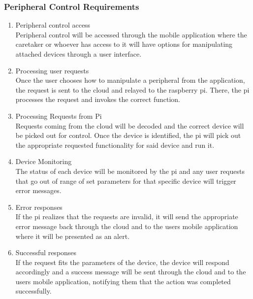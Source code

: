 \subsubsection{Peripheral Control Requirements}
        	\begin{enumerate}
            	\item{Peripheral control access\\Peripheral control will be accessed through the mobile application where the caretaker or whoever has access to it will have options for manipulating attached devices through a user interface.}
                \item{Processing user requests\\Once the user chooses how to manipulate a peripheral from the application, the request is sent to the cloud and relayed to the raspberry pi. There, the pi processes the request and invokes the correct function.}
                \item{Processing Requests from Pi\\ Requests coming from the cloud will be decoded and the correct device will be picked out for control. Once the device is identified, the pi will pick out the appropriate requested functionality for said device and run it.}
                \item{Device Monitoring\\The status of each device will be monitored by the pi and any user requests that go out of range of set parameters for that specific device will trigger error messages.}
                \item{Error responses\\If the pi realizes that the requests are invalid, it will send the appropriate error message back through the cloud and to the users mobile application where it will be presented as an alert.}
                \item{Successful responses\\ If the request fits the parameters of the device, the device will respond accordingly and a success message will be sent through the cloud and to the users mobile application, notifying them that the action was completed successfully.}
            \end{enumerate}

